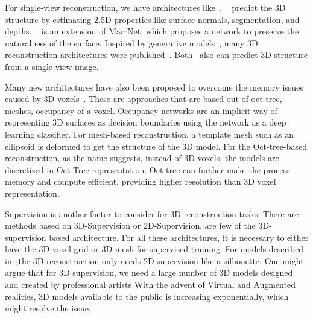 For single-view reconstruction, we have architectures like~\cite{Wu2017,z-gan, Yang2019, Wu2018, popov2020corenet}.
~\cite{Wu2017} predict the 3D structure by estimating 2.5D properties like surface normals, segmentation, and depths.
~\cite{Wu2018} is an extension of MarrNet, which proposes a network to preserve the naturalness of the surface.
Inspired by generative models~\cite{Goodfellow2014,Kingma2014}, many 3D reconstruction architectures were published~\cite{z-gan, Yang2019,Wu2016,Lunz2020InverseGG}.
Both~\cite{Xie_2019, Xie_2020} also can predict 3D structure from a single view image.

Many new architectures have also been proposed to overcome the memory issues caused by 3D voxels~\cite{tatarchenko2017octree,Roth2018,Mescheder2019OccupancyNL,Gkioxari2019MeshR, wang2018pixel2mesh,groueix2018atlasnet,pan2019deep}.
These are approaches that are based out of oct-tree, meshes, occupancy of a voxel.
Occupancy networks are an implicit way of representing 3D surfaces as decision boundaries using the network as a deep learning classifier.
For mesh-based reconstruction, a template mesh such as an ellipsoid is deformed to get the structure of the 3D model.
For the Oct-tree-based reconstruction, as the name suggests, instead of 3D voxels, the models are discretized in Oct-Tree representation.
Oct-tree can further make the process memory and compute efficient, providing higher resolution than 3D voxel representation.

Supervision is another factor to consider for 3D reconstruction tasks.
There are methods based on 3D-Supervision or 2D-Supervision.
\cite{Xie_2019,Xie_2020,Wu2017,groueix2018atlasnet,pan2019deep, chen2019learning} are few of the 3D-supervision based architecture.
For all these architectures, it is necessary to either have the 3D voxel grid or 3D mesh for supervised training.
For models described in~\cite{Lunz2020InverseGG,henderson2019learning},the 3D reconstruction only needs 2D supervision like a silhouette.
One might argue that for 3D supervision, we need a large number of 3D models designed and created by professional artists
With the advent of Virtual and Augmented realities, 3D models available to the public is increasing exponentially, which might resolve the issue.

